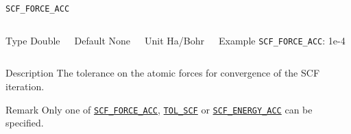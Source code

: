 \begin{frame}[allowframebreaks]{\texttt{SCF\_FORCE\_ACC}} \label{SCF_FORCE_ACC}
\vspace*{-12pt}
\begin{columns}
\begin{block}{Type}
Double
\end{block}

\begin{block}{Default}
None
\end{block}

\begin{block}{Unit}
Ha/Bohr
\end{block}

\begin{block}{Example}
\texttt{SCF\_FORCE\_ACC}: 1e-4
\end{block}
\end{columns}

\begin{block}{Description}
The tolerance on the atomic forces for convergence of the SCF iteration. 
\end{block}

\begin{block}{Remark}
Only one of \hyperlink{SCF_FORCE_ACC}{\texttt{SCF\_FORCE\_ACC}}, \hyperlink{TOL_SCF}{\texttt{TOL\_SCF}} or \hyperlink{SCF_ENERGY_ACC}{\texttt{SCF\_ENERGY\_ACC}} can be specified.
\end{block}

\end{frame}


